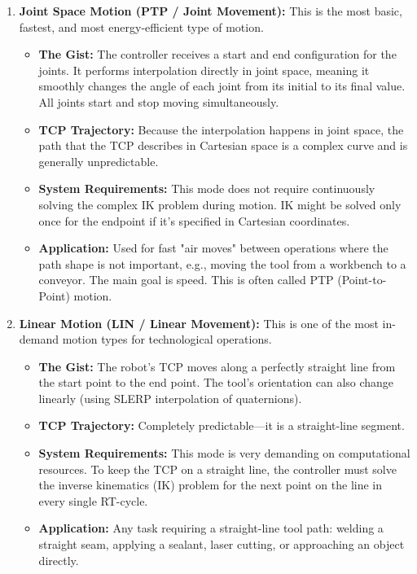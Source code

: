 \begin{enumerate}
    \item \textbf{Joint Space Motion (PTP / Joint Movement):} This is the most basic, fastest, and most energy-efficient type of motion.
    \begin{itemize}
        \item \textbf{The Gist:} The controller receives a start and end configuration for the joints. It performs interpolation directly in joint space, meaning it smoothly changes the angle of each joint from its initial to its final value. All joints start and stop moving simultaneously.
        \item \textbf{TCP Trajectory:} Because the interpolation happens in joint space, the path that the TCP describes in Cartesian space is a complex curve and is generally unpredictable.
        \item \textbf{System Requirements:} This mode does not require continuously solving the complex IK problem during motion. IK might be solved only once for the endpoint if it's specified in Cartesian coordinates.
        \item \textbf{Application:} Used for fast "air moves" between operations where the path shape is not important, e.g., moving the tool from a workbench to a conveyor. The main goal is speed. This is often called PTP (Point-to-Point) motion.
    \end{itemize}

    \item \textbf{Linear Motion (LIN / Linear Movement):} This is one of the most in-demand motion types for technological operations.
    \begin{itemize}
        \item \textbf{The Gist:} The robot's TCP moves along a perfectly straight line from the start point to the end point. The tool's orientation can also change linearly (using SLERP interpolation of quaternions).
        \item \textbf{TCP Trajectory:} Completely predictable—it is a straight-line segment.
        \item \textbf{System Requirements:} This mode is very demanding on computational resources. To keep the TCP on a straight line, the controller must solve the inverse kinematics (IK) problem for the next point on the line in every single RT-cycle.
        \item \textbf{Application:} Any task requiring a straight-line tool path: welding a straight seam, applying a sealant, laser cutting, or approaching an object directly.
    \end{itemize}
    

\end{enumerate}
